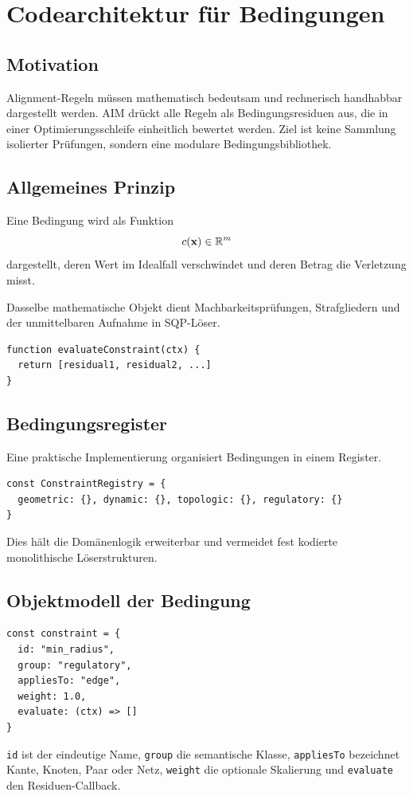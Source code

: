 \chapter{Codearchitektur für Bedingungen}
\section*{Motivation}
Alignment-Regeln müssen mathematisch bedeutsam und rechnerisch handhabbar
dargestellt werden. AIM drückt alle Regeln als Bedingungsresiduen aus, die in
einer Optimierungsschleife einheitlich bewertet werden. Ziel ist keine Sammlung
isolierter Prüfungen, sondern eine modulare Bedingungsbibliothek.

\section{Allgemeines Prinzip}
\begin{definition}[Bedingungsresiduum]
Eine Bedingung wird als Funktion
\[
c(\mathbf x)\in\mathbb{R}^m
\]
dargestellt, deren Wert im Idealfall verschwindet und deren Betrag die
Verletzung misst.
\end{definition}
Dasselbe mathematische Objekt dient Machbarkeitsprüfungen, Strafgliedern und
der unmittelbaren Aufnahme in SQP-Löser.
\begin{verbatim}
function evaluateConstraint(ctx) {
  return [residual1, residual2, ...]
}
\end{verbatim}

\section{Bedingungsregister}
Eine praktische Implementierung organisiert Bedingungen in einem Register.
\begin{verbatim}
const ConstraintRegistry = {
  geometric: {}, dynamic: {}, topologic: {}, regulatory: {}
}
\end{verbatim}
Dies hält die Domänenlogik erweiterbar und vermeidet fest kodierte
monolithische Löserstrukturen.

\section{Objektmodell der Bedingung}
\begin{verbatim}
const constraint = {
  id: "min_radius",
  group: "regulatory",
  appliesTo: "edge",
  weight: 1.0,
  evaluate: (ctx) => []
}
\end{verbatim}
\texttt{id} ist der eindeutige Name, \texttt{group} die semantische Klasse,
\texttt{appliesTo} bezeichnet Kante, Knoten, Paar oder Netz,
\texttt{weight} die optionale Skalierung und \texttt{evaluate} den
Residuen-Callback.

